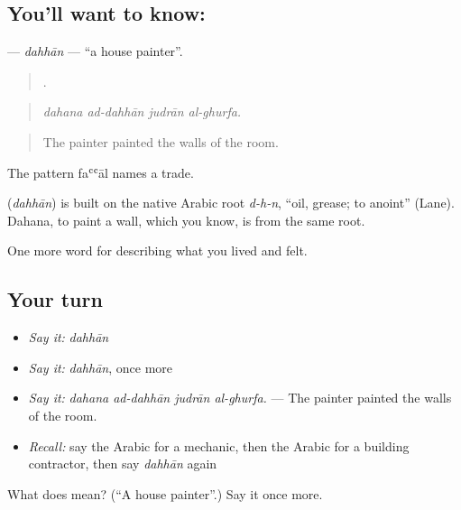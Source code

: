\subsection*{You'll want to know: }
\textbf{} — \emph{dahhān} — \textquotedblleft{}a house painter\textquotedblright{}.

\begin{quote}
   .
\end{quote}

\begin{quote}
\emph{dahana ad-dahhān judrān al-ghurfa.}
\end{quote}

\begin{quote}
The painter painted the walls of the room.
\end{quote}

The pattern faʿʿāl names a trade.

\begin{cousinweb}
\textbf{} (\emph{dahhān}) is built on the native Arabic root \emph{d-h-n}, \textquotedblleft{}oil, grease; to anoint\textquotedblright{} (Lane). Dahana, to paint a wall, which you know, is from the same root.
\end{cousinweb}

\begin{grammarlens}[title={What you've built}]
One more word for describing what you lived and felt.
\end{grammarlens}

\subsection*{Your turn}
\begin{itemize}
\raggedright
  \item \emph{Say it:} \emph{dahhān}
  \item \emph{Say it:} \emph{dahhān}, once more
  \item \emph{Say it:} \emph{dahana ad-dahhān judrān al-ghurfa.} — The painter painted the walls of the room.
  \item \emph{Recall:} say the Arabic for a mechanic, then the Arabic for a building contractor, then say \emph{dahhān} again
\end{itemize}

\begin{tcolorbox}[breakable,colback=teal!4,colframe=teal!35!black,title={Before you move on}]
What does  mean? (\textquotedblleft{}A house painter\textquotedblright{}.) Say it once more.
\end{tcolorbox}
